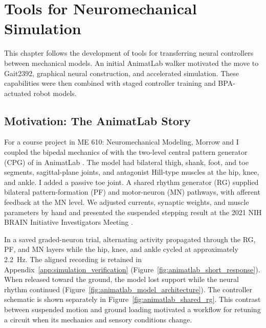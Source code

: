 \chapter{Tools for Neuromechanical Simulation}\label{ch:sns}
\graphicspath{{../Figures/60-sns/}{figs/60-sns/}}

This chapter follows the development of tools for transferring neural controllers between mechanical models. An initial AnimatLab walker motivated the move to Gait2392, graphical neural construction, and accelerated simulation. These capabilities were then combined with staged controller training and BPA-actuated robot models.

\section{Motivation: The AnimatLab Story}\label{sec:prior_walker}\label{sec:animatlab_results}

For a course project in ME 610: Neuromechanical Modeling, Morrow and I coupled the bipedal mechanics of \citet{li_bipedal_2017} with the two-level central pattern generator (CPG) of \citet{deng_neuromechanical_2019} in AnimatLab \citep{cofer_animatlab_2010}. The model had bilateral thigh, shank, foot, and toe segments, sagittal-plane joints, and antagonist Hill-type muscles at the hip, knee, and ankle. I added a passive toe joint. A shared rhythm generator (RG) supplied bilateral pattern-formation (PF) and motor-neuron (MN) pathways, with afferent feedback at the MN level. We adjusted currents, synaptic weights, and muscle parameters by hand and presented the suspended stepping result at the 2021 NIH BRAIN Initiative Investigators Meeting \citep{bolenTorqueValuesArtificialKnee2021June15-17}.

In a saved graded-neuron trial, alternating activity propagated through the RG, PF, and MN layers while the hip, knee, and ankle cycled at approximately \qty{2.2}{\hertz}. The aligned recording is retained in Appendix~\ref{app:simulation_verification} (Figure~\ref{fig:animatlab_short_response}). When released toward the ground, the model lost support while the neural rhythm continued (Figure~\ref{fig:animatlab_model_architecture}). The controller schematic is shown separately in Figure~\ref{fig:animatlab_shared_rg}. This contrast between suspended motion and ground loading motivated a workflow for retuning a circuit when its mechanics and sensory conditions change.

